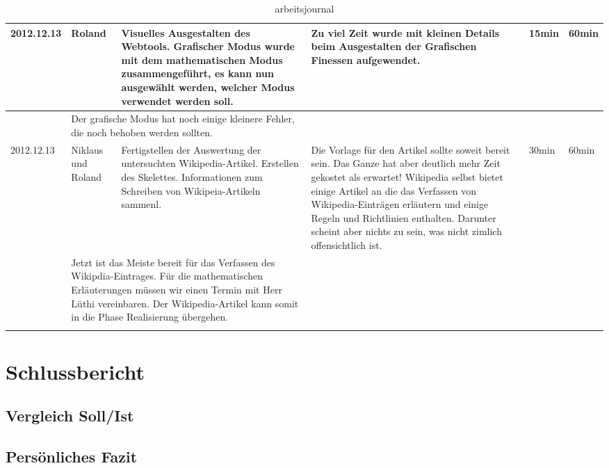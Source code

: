 \documentclass[11pt,paper=a4,final]{scrartcl}
\begin{document}
\begin{landscape}
\begin{longtable}{|p{1.8cm}|p{1.5cm}|p{5.0cm}|p{11.0cm}|l|l|}
    \hline
    2012.12.13 & Roland &
    Visuelles Ausgestalten des Webtools. Grafischer Modus wurde mit dem
    mathematischen Modus zusammengef\"uhrt, es kann nun ausgew\"ahlt werden,
    welcher Modus verwendet werden soll.&
    Zu viel Zeit wurde mit kleinen Details beim Ausgestalten der Grafischen
    Finessen aufgewendet.
    &
    15min & 60min \\ \hline \nopagebreak
    \multicolumn{2}{|l|}{\bf Pendenzen} &\multicolumn{2}{p{16.0cm}|}{
    Der grafische Modus hat noch einige kleinere Fehler, die noch behoben
    werden sollten.
    }  & \multicolumn{2}{l|}{} \\ \hline
    \hline
    2012.12.13 & Niklaus und Roland &
    Fertigstellen der Auswertung der untersuchten Wikipedia-Artikel. Erstellen
    des Skelettes. Informationen zum Schreiben von Wikipeia-Artikeln sammenl.&
    Die Vorlage f\"ur den Artikel sollte soweit bereit sein. Das Ganze hat aber
    deutlich mehr Zeit gekostet als erwartet! Wikipedia selbst bietet einige
    Artikel an die das Verfassen von Wikipedia-Eintr\"agen erl\"autern und
    einige Regeln und Richtlinien enthalten. Darunter scheint aber nichts zu
    sein, was nicht zimlich offensichtlich ist.
    &
    30min & 60min \\ \hline \nopagebreak
    \multicolumn{2}{|l|}{\bf Pendenzen} &\multicolumn{2}{p{16.0cm}|}{Jetzt ist
    das Meiste bereit f\"ur das Verfassen des Wikipdia-Eintrages. F\"ur die
    mathematischen Erl\"auterungen m\"ussen wir einen Termin mit Herr L\"uthi
    vereinbaren. Der Wikipedia-Artikel kann somit in die Phase Realisierung
    \"ubergehen.}  & \multicolumn{2}{l|}{} \\ \hline
  \caption{arbeitsjournal}
  \end{longtable}
\end{landscape}
\section{Schlussbericht}
\subsection{Vergleich Soll/Ist}
\subsection{Pers\"onliches Fazit}
\end{document}
